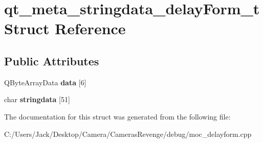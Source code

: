 \hypertarget{structqt__meta__stringdata__delay_form__t}{\section{qt\+\_\+meta\+\_\+stringdata\+\_\+delay\+Form\+\_\+t Struct Reference}
\label{structqt__meta__stringdata__delay_form__t}
}
\subsection*{Public Attributes}
\begin{DoxyCompactItemize}
\item 
\hypertarget{structqt__meta__stringdata__delay_form__t_ae59507629890e0dc1bf369cb3a61be4b}{Q\+Byte\+Array\+Data {\bfseries data} \mbox{[}6\mbox{]}}\label{structqt__meta__stringdata__delay_form__t_ae59507629890e0dc1bf369cb3a61be4b}

\item 
\hypertarget{structqt__meta__stringdata__delay_form__t_a7e20f433652894756a2fd30defcebc0b}{char {\bfseries stringdata} \mbox{[}51\mbox{]}}\label{structqt__meta__stringdata__delay_form__t_a7e20f433652894756a2fd30defcebc0b}

\end{DoxyCompactItemize}


The documentation for this struct was generated from the following file\+:\begin{DoxyCompactItemize}
\item 
C\+:/\+Users/\+Jack/\+Desktop/\+Camera/\+Cameras\+Revenge/debug/moc\+\_\+delayform.\+cpp\end{DoxyCompactItemize}
